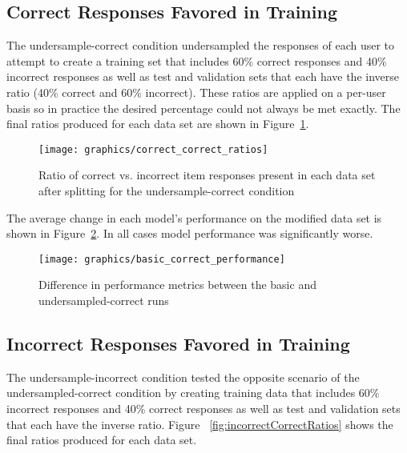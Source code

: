 \documentclass[letterpaper, 12pt, captions=tableabove]{scrreprt}
\begin{document}
		\subsection{Correct Responses Favored in Training}
		\label{sub:correctRatio}

			The undersample-correct condition undersampled the responses of each user to attempt to create a training set that includes 60\% correct responses and 40\% incorrect responses as well as test and validation sets that each have the inverse ratio (40\% correct and 60\% incorrect). These ratios are applied on a per-user basis so in practice the desired percentage could not always be met exactly. The final ratios produced for each data set are shown in Figure~\ref{fig:correctCorrectRatios}.

			\begin{figure}[htbp]
				\centering
				\texttt{[image: graphics/correct\_correct\_ratios]}
				\captionsetup{justification=centering}
				\caption{Ratio of correct vs. incorrect item responses present in each data set after splitting for the undersample-correct condition}
				\label{fig:correctCorrectRatios}
			\end{figure}

			The average change in each model's performance on the modified data set is shown in Figure~\ref{fig:basicVsCorrectPerformance}. In all cases model performance was significantly worse.

			\begin{figure}[htbp]
				\centering
				\texttt{[image: graphics/basic\_correct\_performance]}
				\captionsetup{justification=centering}
				\caption{Difference in performance metrics between the basic and undersampled-correct runs}
				\label{fig:basicVsCorrectPerformance}
			\end{figure}

		\subsection{Incorrect Responses Favored in Training}
		\label{sub:incorrectRatio}
			
			The undersample-incorrect condition tested the opposite scenario of the undersampled-correct condition by creating training data that includes 60\% incorrect responses and 40\% correct responses as well as test and validation sets that each have the inverse ratio. Figure ~\ref{fig:incorrectCorrectRatios} shows the final ratios produced for each data set.
\end{document}
